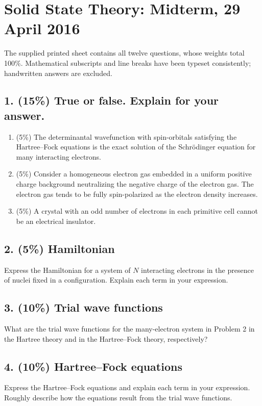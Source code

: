 \chapter{Solid State Theory: Midterm, 29 April 2016}
\label{q:theory-2016-04-midterm}
\begin{sourceNote}
The supplied printed sheet contains all twelve questions, whose weights total 100\%. Mathematical subscripts and line breaks have been typeset consistently; handwritten answers are excluded.
\end{sourceNote}

\section*{1. (15\%) True or false. Explain for your answer.}
\begin{enumerate}[label=(\alph*)]
\item (5\%) The determinantal wavefunction with spin-orbitals satisfying the Hartree--Fock equations is the exact solution of the Schrödinger equation for many interacting electrons.
\item (5\%) Consider a homogeneous electron gas embedded in a uniform positive charge background neutralizing the negative charge of the electron gas. The electron gas tends to be fully spin-polarized as the electron density increases.
\item (5\%) A crystal with an odd number of electrons in each primitive cell cannot be an electrical insulator.
\end{enumerate}

\section*{2. (5\%) Hamiltonian}
Express the Hamiltonian for a system of $N$ interacting electrons in the presence of nuclei fixed in a configuration. Explain each term in your expression.

\section*{3. (10\%) Trial wave functions}
What are the trial wave functions for the many-electron system in Problem 2 in the Hartree theory and in the Hartree--Fock theory, respectively?

\section*{4. (10\%) Hartree--Fock equations}
Express the Hartree--Fock equations and explain each term in your expression. Roughly describe how the equations result from the trial wave functions.

